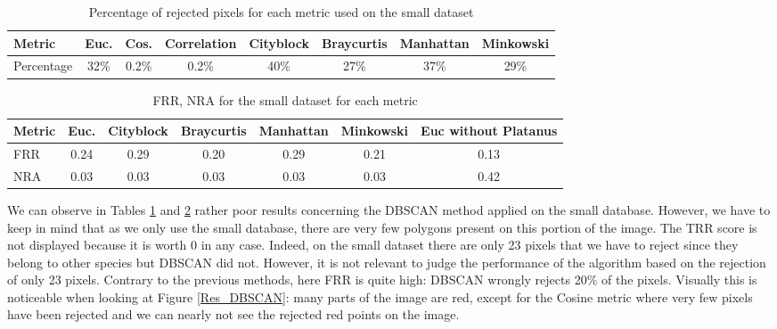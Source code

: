 \documentclass{siamart171218}
\begin{document}
\begin{table}[h!]
\centering   %
\caption{Percentage of rejected pixels for each metric used on the small dataset} 
\begin{tabular}{||p{2cm}|c c c c c c c|} 
 \hline
 \small Metric & \small Euc. & \small Cos. & \small Correlation & \small Cityblock & \small Braycurtis & \small Manhattan & \small Minkowski \\ [0.5ex] 
 \hline\hline
 \small{Percentage} & \small 32\% & \small 0.2\% & \small 0.2\% & \small 40\% & \small 27\% & \small 37\% & \small 29\%\\ [0.5ex]
 \hline
\end{tabular}
\label{perc_pix_rej}
\end{table}

\begin{table}[h!]
\centering   
\caption{FRR, NRA for the small dataset for each metric} 
\begin{tabular}{||p{1cm}|c c c c c||c|} 
 \hline
 \small Metric & \small Euc. & \small Cityblock & \small Braycurtis & \small Manhattan & \small Minkowski & Euc without Platanus \\ [0.5ex] 
 \hline\hline
 \small{FRR} & 0.24 & 0.29 & 0.20 & 0.29 & 0.21 & 0.13\\ [0.5ex]
 \hline
 \small{NRA} & 0.03 & 0.03 & 0.03 & 0.03 &  0.03 & 0.42\\ [0.5ex]
 \hline
\end{tabular}
\label{coef_dbscan}
\end{table}

We can observe in Tables \ref{perc_pix_rej} and \ref{coef_dbscan} rather poor results concerning the DBSCAN method applied on the small database. However, we have to keep in mind that as we only use the small database, there are very few polygons present on this portion of the image. The TRR score is not displayed because it is worth 0 in any case. Indeed, on the small dataset there are only 23 pixels that we have to reject since they belong to other species but DBSCAN did not. However, it is not relevant to judge the performance of the algorithm based on the rejection of only 23 pixels. 
Contrary to the previous methods, here FRR is quite high: DBSCAN wrongly rejects 20\% of the pixels. Visually this is noticeable when looking at Figure \ref{Res_DBSCAN}: many parts of the image are red,  except for the Cosine metric where very few pixels have been rejected and we can nearly not see the rejected red points on the image. 
\end{document}
